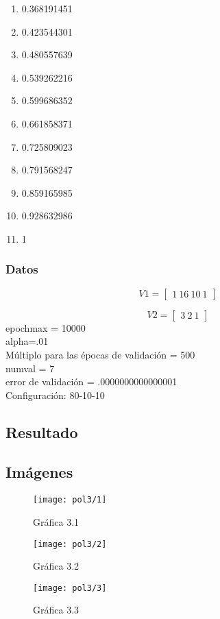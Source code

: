 \documentclass[6pt]{article}
\begin{document}
\begin{multicols}{4}
\begin{enumerate}
		\item 0.368191451
		\item 0.423544301
		\item 0.480557639
		\item 0.539262216
		\item 0.599686352
		\item 0.661858371
		\item 0.725809023
		\item 0.791568247
		\item 0.859165985
		\item 0.928632986
		\item 1
	\end{enumerate}
\end{multicols}
\subsubsection{Datos}
\[V1=
\begin{bmatrix}
1\ 16\ 10\ 1
\end{bmatrix}\]

\[V2=
\begin{bmatrix}
3\ 2\ 1
\end{bmatrix}\]
epochmax = 10000\\
alpha=.01\\
Múltiplo para las épocas de validación = 500\\
numval = 7\\
error de validación = .0000000000000001\\
Configuración: 80-10-10
\subsection{Resultado}
\subsection{Imágenes}
\begin{figure}[htpb]
	\centering
	\texttt{[image: pol3/1]}
	\caption{Gráfica 3.1}
\end{figure}

\begin{figure}[htpb]
	\centering
	\texttt{[image: pol3/2]}
	\caption{Gráfica 3.2}
\end{figure}

\begin{figure}[htpb]
	\centering
	\texttt{[image: pol3/3]}
	\caption{Gráfica 3.3}
\end{figure}
\end{document}
